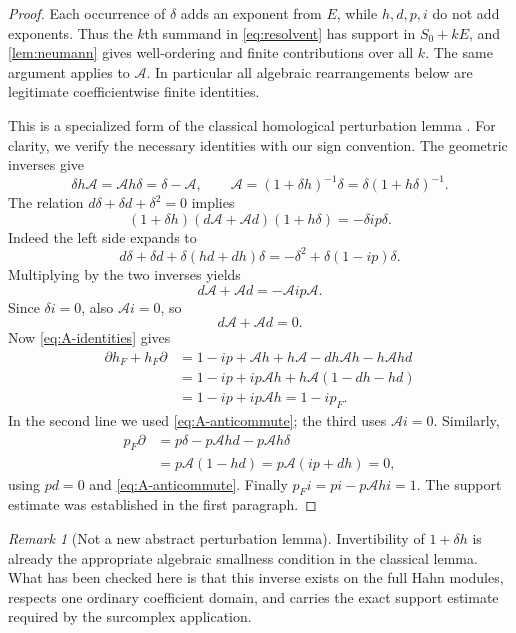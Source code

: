 \documentclass[11pt,letterpaper]{article}
\theoremstyle{definition}
\theoremstyle{remark}
\newtheorem{remark}[theorem]{Remark}
\numberwithin{equation}{section}
\begin{document}
\begin{proof}
Each occurrence of $\delta$ adds an exponent from $E$, while $h,d,p,i$ do not add exponents. Thus the $k$th summand in \eqref{eq:resolvent} has support in $S_0+kE$, and \cref{lem:neumann} gives well-ordering and finite contributions over all $k$. The same argument applies to $\mathcal A$. In particular all algebraic rearrangements below are legitimate coefficientwise finite identities.

This is a specialized form of the classical homological perturbation lemma \cite{Crainic}. For clarity, we verify the necessary identities with our sign convention. The geometric inverses give
\begin{equation}\label{eq:A-identities}
 \delta h\mathcal A=\mathcal A h\delta=\delta-\mathcal A,
 \qquad
 \mathcal A=(1+\delta h)^{-1}\delta
 =\delta(1+h\delta)^{-1}.
\end{equation}
The relation $d\delta+\delta d+\delta^2=0$ implies
\[
 (1+\delta h)(d\mathcal A+\mathcal A d)(1+h\delta)
 =-\delta ip\delta.
\]
Indeed the left side expands to
\[
 d\delta+\delta d+\delta(hd+dh)\delta
 =-\delta^2+\delta(1-ip)\delta.
\]
Multiplying by the two inverses yields
\[
 d\mathcal A+\mathcal A d=-\mathcal A ip\mathcal A.
\]
Since $\delta i=0$, also $\mathcal A i=0$, so
\begin{equation}\label{eq:A-anticommute}
 d\mathcal A+\mathcal A d=0.
\end{equation}
Now \eqref{eq:A-identities} gives
\begin{align*}
 \partial h_F+h_F\partial
 &=1-ip+\mathcal A h+h\mathcal A
      -dh\mathcal A h-h\mathcal A hd\\
 &=1-ip+ip\mathcal A h
      +h\mathcal A(1-dh-hd)\\
 &=1-ip+ip\mathcal A h
 =1-ip_F.
\end{align*}
In the second line we used \eqref{eq:A-anticommute}; the third uses $\mathcal A i=0$. Similarly,
\begin{align*}
 p_F\partial
 &=p\delta-p\mathcal A hd-p\mathcal A h\delta\\
 &=p\mathcal A(1-hd)
 =p\mathcal A(ip+dh)=0,
\end{align*}
using $pd=0$ and \eqref{eq:A-anticommute}. Finally $p_Fi=pi-p\mathcal A hi=1$. The support estimate was established in the first paragraph.
\end{proof}

\begin{remark}[Not a new abstract perturbation lemma]
Invertibility of $1+\delta h$ is already the appropriate algebraic smallness condition in the classical lemma. What has been checked here is that this inverse exists on the full Hahn modules, respects one ordinary coefficient domain, and carries the exact support estimate required by the surcomplex application.
\end{remark}
\end{document}
